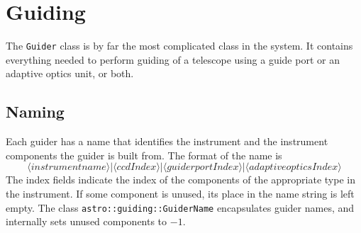 %
%
\chapter{Guiding\label{chapter:guiding}}
The \texttt{Guider} class is by far the most complicated class in the
system.
It contains everything needed to perform guiding of a telescope 
using a guide port or an adaptive optics unit, or both.

\section{Naming}
Each guider has a name that identifies the instrument and the instrument
components the guider is built from.
The format of the name is
\[
\langle\textit{instrumentname}\rangle
\texttt{|}
\langle\textit{ccdIndex}\rangle
\texttt{|}
\langle\textit{guiderportIndex}\rangle
\texttt{|}
\langle\textit{adaptiveopticsIndex}\rangle
\]
The index fields indicate the index of the components of the appropriate
type in the instrument.
If some component is unused, its place in the name string is left empty.
The class \texttt{astro::guiding::GuiderName} encapsulates guider names,
and internally sets unused components to $-1$.


